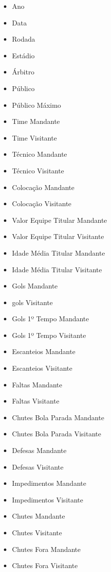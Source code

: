 \documentclass[conference]{IEEEtran}
\begin{document}
\begin{itemize}
    \item Ano
    \item Data
    \item Rodada
    \item Estádio
    \item Árbitro
    \item Público
    \item Público Máximo
    \item Time Mandante
    \item Time Visitante
    \item Técnico Mandante
    \item Técnico Visitante
    \item Colocação Mandante
    \item Colocação Visitante
    \item Valor Equipe Titular Mandante
    \item Valor Equipe Titular Visitante
    \item Idade Média Titular Mandante
    \item Idade Média Titular Visitante
    \item Gols Mandante
    \item gols Visitante
    \item Gols 1º Tempo Mandante
    \item Gols 1º Tempo Visitante
    \item Escanteios Mandante
    \item Escanteios Visitante
    \item Faltas Mandante
    \item Faltas Visitante
    \item Chutes Bola Parada Mandante
    \item Chutes Bola Parada Visitante
    \item Defesas Mandante
    \item Defesas Visitante
    \item Impedimentos Mandante
    \item Impedimentos Visitante
    \item Chutes Mandante
    \item Chutes Visitante
    \item Chutes Fora Mandante
    \item Chutes Fora Visitante
\end{itemize}
\end{document}

